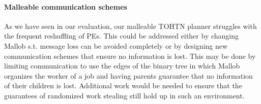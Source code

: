 \begin{comment}
In SAT solving, restarts have long been an important part of solvers to increase their performance.

- we perform restarts according to the harmonic series
- SAT solving already knows restarts, explore inner-outer and luby sequence for potentially better performance

- \cite{langley1992systematic} suggests iterative sampling as an extreme form of restarts
- \cite{crawford1994experimental} uses restarts via iterative sampling for SAT solving
- \cite{gomes1998boosting} use restarts in planning, argue their use in combinatorial search
- \cite{biere2015evaluating}
- optimal restart points may be unknown
- frequent restarts may help in learning
- long times may be needed to find solutions
- show that luby is quite good
- different restart policies:
- static: uniform, geometric, luby
- dynamic: agility - prohibit restart depending on status, 
- \cite{luby1993optimal} propose the luby sequence as a strategy
- \cite{huang2007effect} use luby sequence in SAT
\end{comment}

\paragraph{Malleable communication schemes}
As we have seen in our evaluation, our malleable TOHTN planner struggles with the frequent reshuffling of PEs. This could be addressed either by changing Mallob s.t. message loss can be avoided completely or by designing new communication schemes that ensure no information is lost. This may be done by limiting communication to use the edges of the binary tree in which Mallob organizes the worker of a job and having parents guarantee that no information of their children is lost. Additional work would be needed to ensure that the guarantees of randomized work stealing still hold up in such an environment.
